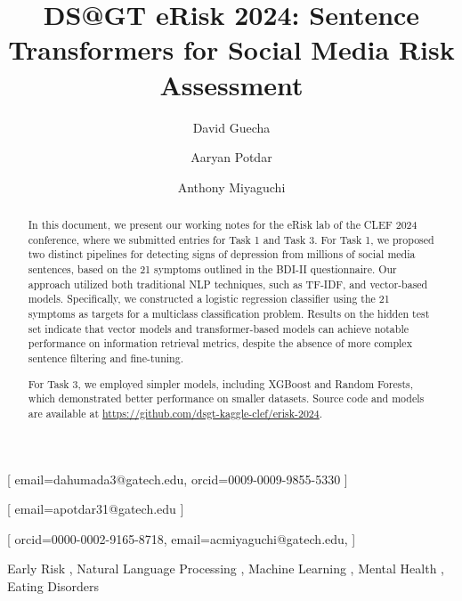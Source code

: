\documentclass[]{style/ceurart}
\begin{document}


\title{
DS@GT eRisk 2024: Sentence Transformers for Social Media Risk Assessment
}

\author[1]{David Guecha}[
email=dahumada3@gatech.edu,
orcid=0009-0009-9855-5330
]
\author[1]{Aaryan Potdar}[
email=apotdar31@gatech.edu
]
\author[1]{Anthony Miyaguchi}[
orcid=0000-0002-9165-8718,
email=acmiyaguchi@gatech.edu,
]
\cormark[1]

\address[1]{Georgia Institute of Technology, North Ave NW, Atlanta, GA 30332}


\begin{abstract}
In this document, we present our working notes for the eRisk lab of the CLEF 2024 conference, where we submitted entries for Task 1 and Task 3. For Task 1, we proposed two distinct pipelines for detecting signs of depression from millions of social media sentences, based on the 21 symptoms outlined in the BDI-II questionnaire. Our approach utilized both traditional NLP techniques, such as TF-IDF, and vector-based models. Specifically, we constructed a logistic regression classifier using the 21 symptoms as targets for a multiclass classification problem. Results on the hidden test set indicate that vector models and transformer-based models can achieve notable performance on information retrieval metrics, despite the absence of more complex sentence filtering and fine-tuning.

For Task 3, we employed simpler models, including XGBoost and Random Forests, which demonstrated better performance on smaller datasets. Source code and models are available at \href{https://github.com/dsgt-kaggle-clef/erisk-2024}{https://github.com/dsgt-kaggle-clef/erisk-2024}.

\end{abstract}

\begin{keywords}
  Early Risk \sep
  Natural Language Processing \sep
  Machine Learning \sep
  Mental Health \sep
  Eating Disorders
\end{keywords}


\maketitle
\end{document}
